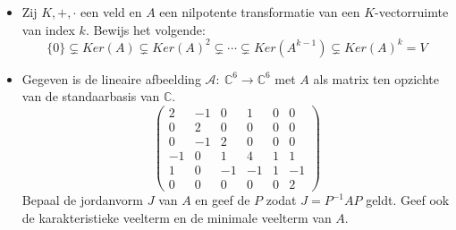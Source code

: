 \documentclass[main.tex]{subfiles}
\begin{document}
 \begin{itemize}
 \item Zij $K,+,\cdot$ een veld en $A$ een nilpotente transformatie van een $K$-vectorruimte van index $k$.
   Bewijs het volgende:
   \[ \{0\} \subsetneq Ker(A) \subsetneq Ker(A)^{2} \subsetneq \dotsb \subsetneq Ker(A^{k-1}) \subsetneq Ker(A)^{k} = V \]
 \item Gegeven is de lineaire afbeelding $\mathcal{A}:\ \mathbb{C}^{6} \rightarrow \mathbb{C}^{6}$ met $A$ als matrix ten opzichte van de standaarbasis van $\mathbb{C}$.
   \[
   \begin{pmatrix}
     2 & -1 & 0 & 1 & 0 & 0\\
     0 & 2 & 0 & 0 & 0 & 0\\
     0 & -1 & 2 & 0 & 0 & 0\\
     -1 & 0 & 1 & 4 & 1 & 1\\
     1 & 0 & -1 & -1 & 1 & -1\\
     0 & 0 & 0 & 0 & 0 & 2
   \end{pmatrix}
   \]
   Bepaal de jordanvorm $J$ van $A$ en geef de $P$ zodat $J=P^{-1}AP$ geldt.
   Geef ook de karakteristieke veelterm en de minimale veelterm van $A$.


\end{itemize}
\end{document}
